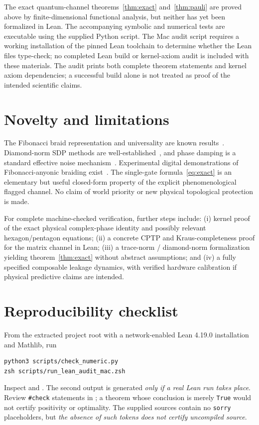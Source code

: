 \documentclass[11pt,a4paper]{article}
\theoremstyle{remark}
\begin{document}
The exact quantum-channel theorems~\ref{thm:exact} and~\ref{thm:pauli} are proved above by finite-dimensional functional analysis, but neither has yet been formalized in Lean. The accompanying symbolic and numerical tests are executable using the supplied Python script. The Mac audit script requires a working installation of the pinned Lean toolchain to determine whether the Lean files type-check; no completed Lean build or kernel-axiom audit is included with these materials. The audit prints both complete theorem statements and kernel axiom dependencies; a successful build alone is not treated as proof of the intended scientific claims.

\section{Novelty and limitations}
The Fibonacci braid representation and universality are known results~\cite{bonesteel2005,hormozi2007,trebst2008}. Diamond-norm SDP methods are well-established~\cite{watrous2009,watrous2012}, and phase damping is a standard effective noise mechanism~\cite{dephasing2021}. Experimental digital demonstrations of Fibonacci-anyonic braiding exist~\cite{andersen2024}. The single-gate formula~\eqref{eq:exact} is an elementary but useful closed-form property of the explicit phenomenological flagged channel. No claim of world priority or new physical topological protection is made.

For complete machine-checked verification, further steps include: (i) kernel proof of the exact physical complex-phase identity and possibly relevant hexagon/pentagon equations; (ii) a concrete CPTP and Kraus-completeness proof for the matrix channel in Lean; (iii) a trace-norm / diamond-norm formalization yielding theorem~\ref{thm:exact} without abstract assumptions; and (iv) a fully specified composable leakage dynamics, with verified hardware calibration if physical predictive claims are intended.

\appendix
\section{Reproducibility checklist}
From the extracted project root with a network-enabled Lean 4.19.0 installation and Mathlib, run
\begin{verbatim}
python3 scripts/check_numeric.py
zsh scripts/run_lean_audit_mac.zsh
\end{verbatim}
Inspect  and . The second output is generated \emph{only if a real Lean run takes place}. Review \texttt{\#check} statements in ; a theorem whose conclusion is merely \texttt{True} would not certify positivity or optimality. The supplied sources contain no \texttt{sorry} placeholders, but \emph{the absence of such tokens does not certify uncompiled source}.
\end{document}
